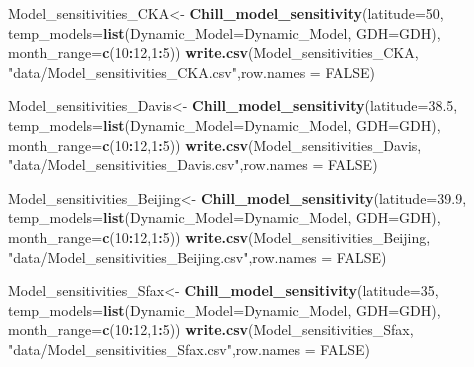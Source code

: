 \documentclass[
]{book}
\newenvironment{Shaded}{\begin{snugshade}}{\end{snugshade}}
\newcommand{\DataTypeTok}[1]{\textcolor[rgb]{0.13,0.29,0.53}{#1}}
\newcommand{\DecValTok}[1]{\textcolor[rgb]{0.00,0.00,0.81}{#1}}
\newcommand{\FloatTok}[1]{\textcolor[rgb]{0.00,0.00,0.81}{#1}}
\newcommand{\KeywordTok}[1]{\textcolor[rgb]{0.13,0.29,0.53}{\textbf{#1}}}
\newcommand{\NormalTok}[1]{#1}
\newcommand{\OperatorTok}[1]{\textcolor[rgb]{0.81,0.36,0.00}{\textbf{#1}}}
\newcommand{\OtherTok}[1]{\textcolor[rgb]{0.56,0.35,0.01}{#1}}
\newcommand{\StringTok}[1]{\textcolor[rgb]{0.31,0.60,0.02}{#1}}
\begin{document}
\begin{Shaded}
\begin{Highlighting}[]
\NormalTok{Model_sensitivities_CKA<-}
\StringTok{  }\KeywordTok{Chill_model_sensitivity}\NormalTok{(}\DataTypeTok{latitude=}\DecValTok{50}\NormalTok{,}
                          \DataTypeTok{temp_models=}\KeywordTok{list}\NormalTok{(}\DataTypeTok{Dynamic_Model=}\NormalTok{Dynamic_Model,}
                                           \DataTypeTok{GDH=}\NormalTok{GDH),}
                          \DataTypeTok{month_range=}\KeywordTok{c}\NormalTok{(}\DecValTok{10}\OperatorTok{:}\DecValTok{12}\NormalTok{,}\DecValTok{1}\OperatorTok{:}\DecValTok{5}\NormalTok{))}
\KeywordTok{write.csv}\NormalTok{(Model_sensitivities_CKA,}
          \StringTok{"data/Model_sensitivities_CKA.csv"}\NormalTok{,}\DataTypeTok{row.names =} \OtherTok{FALSE}\NormalTok{)}

\NormalTok{Model_sensitivities_Davis<-}
\StringTok{  }\KeywordTok{Chill_model_sensitivity}\NormalTok{(}\DataTypeTok{latitude=}\FloatTok{38.5}\NormalTok{,}
                          \DataTypeTok{temp_models=}\KeywordTok{list}\NormalTok{(}\DataTypeTok{Dynamic_Model=}\NormalTok{Dynamic_Model,}
                                           \DataTypeTok{GDH=}\NormalTok{GDH),}
                          \DataTypeTok{month_range=}\KeywordTok{c}\NormalTok{(}\DecValTok{10}\OperatorTok{:}\DecValTok{12}\NormalTok{,}\DecValTok{1}\OperatorTok{:}\DecValTok{5}\NormalTok{))}
\KeywordTok{write.csv}\NormalTok{(Model_sensitivities_Davis,}
          \StringTok{"data/Model_sensitivities_Davis.csv"}\NormalTok{,}\DataTypeTok{row.names =} \OtherTok{FALSE}\NormalTok{)}

\NormalTok{Model_sensitivities_Beijing<-}
\StringTok{  }\KeywordTok{Chill_model_sensitivity}\NormalTok{(}\DataTypeTok{latitude=}\FloatTok{39.9}\NormalTok{,}
                          \DataTypeTok{temp_models=}\KeywordTok{list}\NormalTok{(}\DataTypeTok{Dynamic_Model=}\NormalTok{Dynamic_Model, }
                                           \DataTypeTok{GDH=}\NormalTok{GDH),}
                          \DataTypeTok{month_range=}\KeywordTok{c}\NormalTok{(}\DecValTok{10}\OperatorTok{:}\DecValTok{12}\NormalTok{,}\DecValTok{1}\OperatorTok{:}\DecValTok{5}\NormalTok{))}
\KeywordTok{write.csv}\NormalTok{(Model_sensitivities_Beijing,}
          \StringTok{"data/Model_sensitivities_Beijing.csv"}\NormalTok{,}\DataTypeTok{row.names =} \OtherTok{FALSE}\NormalTok{)}

\NormalTok{Model_sensitivities_Sfax<-}
\StringTok{  }\KeywordTok{Chill_model_sensitivity}\NormalTok{(}\DataTypeTok{latitude=}\DecValTok{35}\NormalTok{,}
                          \DataTypeTok{temp_models=}\KeywordTok{list}\NormalTok{(}\DataTypeTok{Dynamic_Model=}\NormalTok{Dynamic_Model,}
                                           \DataTypeTok{GDH=}\NormalTok{GDH),}
                          \DataTypeTok{month_range=}\KeywordTok{c}\NormalTok{(}\DecValTok{10}\OperatorTok{:}\DecValTok{12}\NormalTok{,}\DecValTok{1}\OperatorTok{:}\DecValTok{5}\NormalTok{))}
\KeywordTok{write.csv}\NormalTok{(Model_sensitivities_Sfax,}
          \StringTok{"data/Model_sensitivities_Sfax.csv"}\NormalTok{,}\DataTypeTok{row.names =} \OtherTok{FALSE}\NormalTok{)}
\end{Highlighting}
\end{Shaded}
\end{document}
